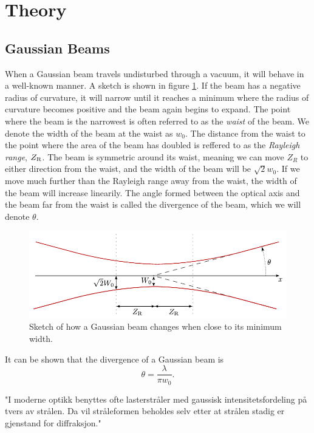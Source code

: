 \documentclass[a4paper, 11pt, notitlepage, english]{article}
\begin{document}
\clearpage

\section{Theory}

\subsection{Gaussian Beams}



When a Gaussian beam travels undisturbed through a vacuum, it will behave in a well-known manner. A sketch is shown in figure \ref{fig:gaussian_beam}. If the beam has a negative radius of curvature, it will narrow until it reaches a minimum where the radius of curvature becomes positive and the beam again begins to expand. The point where the beam is the narrowest is often referred to as the \emph{waist} of the beam. We denote the width of the beam at the waist as $w_0$. The distance from the waist to the point where the area of the beam has doubled is reffered to as the \emph{Rayleigh range}, $Z_{\rm R}$. The beam is symmetric around its waist, meaning we can move $Z_R$ to either direction from the waist, and the width of the beam will be $\sqrt{2}w_0$. If we move much further than the Rayleigh range away from the waist, the width of the beam will increase linearily. The angle formed between the optical axis and the beam far from the waist is called the divergence of the beam, which we will denote $\theta$.

\begin{figure}[htpb]
\includegraphics[width=\textwidth]{beam.pdf}	
\caption{Sketch of how a Gaussian beam changes when close to its minimum width. \label{fig:gaussian_beam}}
\end{figure}

It can be shown that the divergence of a Gaussian beam is
$$\theta = \frac{\lambda}{\pi w_0}.$$


"I moderne optikk benyttes ofte lasterstråler med gaussisk intensitetsfordeling på tvers av strålen. Da vil stråleformen beholdes selv etter at strålen stadig er gjenstand for diffraksjon."
\end{document}
